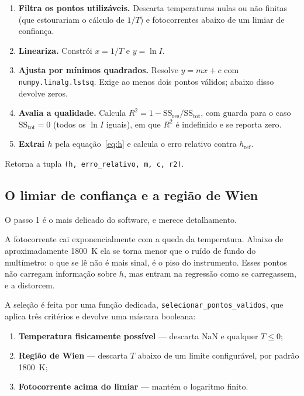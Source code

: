 \documentclass[11pt,a4paper]{article}
\begin{document}
\begin{enumerate}
  \item \textbf{Filtra os pontos utilizáveis.} Descarta temperaturas nulas ou
        não finitas (que estourariam o cálculo de $1/T$) e fotocorrentes abaixo
        de um limiar de confiança.
  \item \textbf{Lineariza.} Constrói $x = 1/T$ e $y = \ln I$.
  \item \textbf{Ajusta por mínimos quadrados.} Resolve $y = mx + c$ com
        \texttt{numpy.linalg.lstsq}. Exige ao menos dois pontos válidos; abaixo
        disso devolve zeros.
  \item \textbf{Avalia a qualidade.} Calcula
        $R^2 = 1 - \mathrm{SS}_{\text{res}}/\mathrm{SS}_{\text{tot}}$, com
        guarda para o caso $\mathrm{SS}_{\text{tot}} = 0$ (todos os $\ln I$
        iguais), em que $R^2$ é indefinido e se reporta zero.
  \item \textbf{Extrai $h$} pela equação~\eqref{eq:h} e calcula o erro relativo
        contra $h_{\text{ref}}$.
\end{enumerate}

Retorna a tupla \texttt{(h, erro\_relativo, m, c, r2)}.

\subsection{O limiar de confiança e a região de Wien}
\label{sec:limiar}

O passo 1 é o mais delicado do software, e merece detalhamento.

A fotocorrente cai exponencialmente com a queda da temperatura. Abaixo de
aproximadamente 1800~K ela se torna menor que o ruído de fundo do multímetro:
o que se lê não é mais sinal, é o piso do instrumento. Esses pontos não carregam
informação sobre $h$, mas entram na regressão como se carregassem, e a
distorcem.

A seleção é feita por uma função dedicada, \texttt{selecionar\_pontos\_validos},
que aplica três critérios e devolve uma máscara booleana:

\begin{enumerate}[nosep]
  \item \textbf{Temperatura fisicamente possível} --- descarta NaN e qualquer
        $T \le 0$;
  \item \textbf{Região de Wien} --- descarta $T$ abaixo de um limite
        configurável, por padrão 1800~K;
  \item \textbf{Fotocorrente acima do limiar} --- mantém o logaritmo finito.
\end{enumerate}
\end{document}
